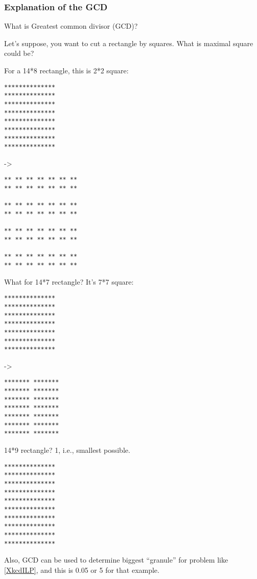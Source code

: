 \subsubsection{Explanation of the \ac{GCD}}
\label{GCD}

What is Greatest common divisor (\ac{GCD})?

Let's suppose, you want to cut a rectangle by squares. What is maximal square could be?

For a 14*8 rectangle, this is 2*2 square:

\begin{lstlisting}
**************
**************
**************
**************
**************
**************
**************
**************
\end{lstlisting}

->

\begin{lstlisting}
** ** ** ** ** ** **
** ** ** ** ** ** **
                  
** ** ** ** ** ** **
** ** ** ** ** ** **
                  
** ** ** ** ** ** **
** ** ** ** ** ** **
                  
** ** ** ** ** ** **
** ** ** ** ** ** **
\end{lstlisting}

What for 14*7 rectangle? It's 7*7 square:

\begin{lstlisting}
**************
**************
**************
**************
**************
**************
**************
\end{lstlisting}

->

\begin{lstlisting}
******* *******
******* *******
******* *******
******* *******
******* *******
******* *******
******* *******
\end{lstlisting}

14*9 rectangle? 1, i.e., smallest possible.

\begin{lstlisting}
**************
**************
**************
**************
**************
**************
**************
**************
**************
**************
\end{lstlisting}

Also, GCD can be used to determine biggest ``granule'' for problem like \ref{XkcdILP}, and this is 0.05 or 5 for that example.


